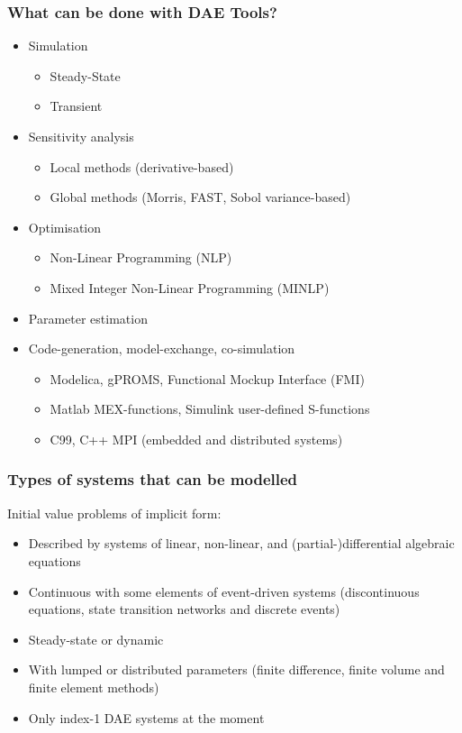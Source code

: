 \documentclass[compress,newPxFont,sthlmFooter]{beamer}
\begin{document}
\begin{frame}
\frametitle{What can be done with DAE Tools?} 
\begin{itemize}
  \item \alert{Simulation}
    \begin{itemize}
      \item Steady-State 
      \item Transient
    \end{itemize}
  \item \alert{Sensitivity analysis}
    \begin{itemize}
      \item Local methods (derivative-based) 
      \item Global methods (Morris, FAST, Sobol variance-based)
    \end{itemize}
  \item \alert{Optimisation}
    \begin{itemize}
      \item Non-Linear Programming (NLP)
      \item Mixed Integer Non-Linear Programming (MINLP)
    \end{itemize}
  \item \alert{Parameter estimation}
  \item \alert{Code-generation}, \alert{model-exchange}, \alert{co-simulation} 
    \begin{itemize}
      \item Modelica, gPROMS, Functional Mockup Interface (FMI)
      \item Matlab MEX-functions, Simulink user-defined S-functions
      \item C99, C++ MPI (embedded and distributed systems) 
    \end{itemize}
\end{itemize}
\end{frame}

\begin{frame}
\frametitle{Types of systems that can be modelled}
  \alert{Initial value problems of implicit form}:
    \begin{itemize}
      \item Described by \alert{systems of linear, non-linear, and (partial-)differential} algebraic equations
      \item \alert{Continuous} with some elements of \alert{event-driven} systems 
            (discontinuous equations, state transition networks and discrete events) 
      \item \alert{Steady-state} or \alert{dynamic}
      \item With \alert{lumped} or \alert{distributed} parameters 
            (finite difference, finite volume and finite element methods)
      \item Only \alert{index-1} DAE systems at the moment
    \end{itemize}
\end{frame}
\end{document}
